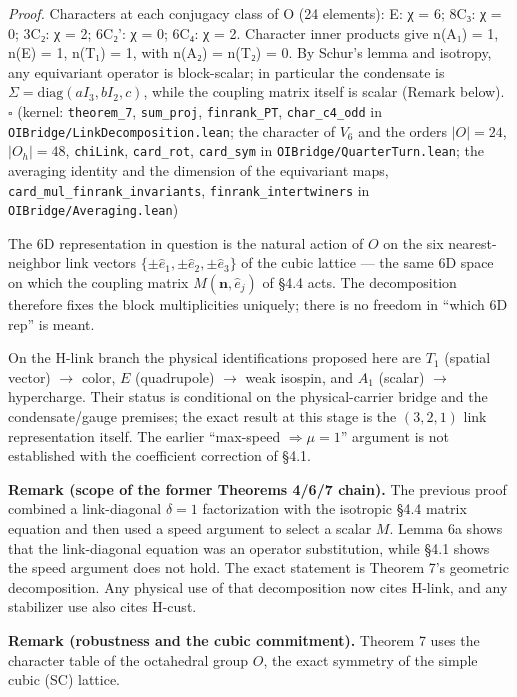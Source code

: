 \documentclass[
]{article}
\begin{document}
\emph{Proof.} Characters at each conjugacy class of O (24 elements): E:
χ = 6; 8C₃: χ = 0; 3C₂: χ = 2; 6C₂': χ = 0; 6C₄: χ = 2. Character inner
products give n(A₁) = 1, n(E) = 1, n(T₁) = 1, with n(A₂) = n(T₂) = 0. By
Schur's lemma and isotropy, any equivariant operator is block-scalar; in
particular the condensate is
\(\Sigma = \mathrm{diag}(a I_3, b I_2, c)\), while the coupling matrix
itself is scalar (Remark below). \(\square\) (kernel:
\texttt{theorem\_7}, \texttt{sum\_proj}, \texttt{finrank\_PT},
\texttt{char\_c4\_odd} in \texttt{OIBridge/LinkDecomposition.lean}; the
character of \(V_6\) and the orders \(|O| = 24\), \(|O_h| = 48\),
\texttt{chiLink}, \texttt{card\_rot}, \texttt{card\_sym} in
\texttt{OIBridge/QuarterTurn.lean}; the averaging identity and the
dimension of the equivariant maps,
\texttt{card\_mul\_finrank\_invariants}, \texttt{finrank\_intertwiners}
in \texttt{OIBridge/Averaging.lean})

The 6D representation in question is the natural action of \(O\) on the
six nearest-neighbor link vectors
\(\{\pm\hat e_1, \pm\hat e_2, \pm\hat e_3\}\) of the cubic lattice ---
the same 6D space on which the coupling matrix
\(M(\mathbf{n}, \hat e_j)\) of §4.4 acts. The decomposition therefore
fixes the block multiplicities uniquely; there is no freedom in ``which
6D rep'' is meant.

On the H-link branch the physical identifications proposed here are
\(T_1\) (spatial vector) \(\to\) color, \(E\) (quadrupole) \(\to\) weak
isospin, and \(A_1\) (scalar) \(\to\) hypercharge. Their status is
conditional on the physical-carrier bridge and the condensate/gauge
premises; the exact result at this stage is the \((3,2,1)\) link
representation itself. The earlier ``max-speed \(\Rightarrow\mu=1\)''
argument is not established with the coefficient correction of §4.1.

\textbf{Remark (scope of the former Theorems 4/6/7 chain).} The previous
proof combined a link-diagonal \(\delta=1\) factorization with the
isotropic §4.4 matrix equation and then used a speed argument to select
a scalar \(M\). Lemma 6a shows that the link-diagonal equation was an
operator substitution, while §4.1 shows the speed argument does not
hold. The exact statement is Theorem 7's geometric decomposition. Any
physical use of that decomposition now cites H-link, and any stabilizer
use also cites H-cust.

\textbf{Remark (robustness and the cubic commitment).} Theorem 7 uses
the character table of the octahedral group \(O\), the exact symmetry of
the simple cubic (SC) lattice.
\end{document}
